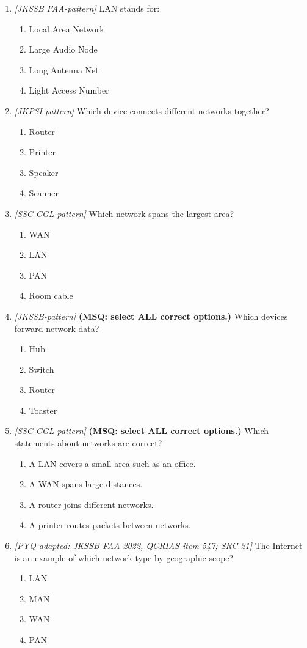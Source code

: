\begin{enumerate}[label=\textbf{Q\arabic*.}, leftmargin=*]
\item \textit{[JKSSB FAA-pattern]} LAN stands for:
  \begin{enumerate}[label=\Alph*.]
    \item Local Area Network
    \item Large Audio Node
    \item Long Antenna Net
    \item Light Access Number
  \end{enumerate}
\item \textit{[JKPSI-pattern]} Which device connects different networks together?
  \begin{enumerate}[label=\Alph*.]
    \item Router
    \item Printer
    \item Speaker
    \item Scanner
  \end{enumerate}
\item \textit{[SSC CGL-pattern]} Which network spans the largest area?
  \begin{enumerate}[label=\Alph*.]
    \item WAN
    \item LAN
    \item PAN
    \item Room cable
  \end{enumerate}
\item \textit{[JKSSB-pattern]} \textbf{(MSQ: select ALL correct options.)} Which devices forward network data?
  \begin{enumerate}[label=\Alph*.]
    \item Hub
    \item Switch
    \item Router
    \item Toaster
  \end{enumerate}
\item \textit{[SSC CGL-pattern]} \textbf{(MSQ: select ALL correct options.)} Which statements about networks are correct?
  \begin{enumerate}[label=\Alph*.]
    \item A LAN covers a small area such as an office.
    \item A WAN spans large distances.
    \item A router joins different networks.
    \item A printer routes packets between networks.
  \end{enumerate}
\item \textit{[PYQ-adapted: JKSSB FAA 2022, QCRIAS item 547; SRC-21]} The Internet is an example of which network type by geographic scope?
  \begin{enumerate}[label=\Alph*.]
\item LAN
   \item MAN
   \item WAN
   \item PAN
  \end{enumerate}


\end{enumerate}
